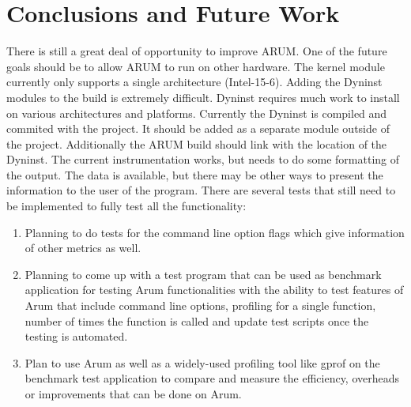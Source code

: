 \documentclass[11pt,letterpaper,oneside]{article}
\begin{document}
\section{Conclusions and Future Work}
\label{sec:conclusion}
There is still a great deal of opportunity to improve ARUM.   One of the future goals should be to allow ARUM to run on other hardware.  The kernel module currently only supports a single architecture (Intel-15-6).  Adding the Dyninst modules to the build is extremely difficult.  Dyninst requires much work to install on various architectures and platforms.   Currently the Dyninst is compiled and commited with the project.  It should be added as a separate module outside of the project.  Additionally the ARUM build should link with the location of the Dyninst.
\newline
The current instrumentation works, but needs to do some formatting of the output.  The data is available, but there may be other ways to present the information to the user of the program.
\newline
There are several tests that still need to be implemented to fully test all the functionality:
\begin{enumerate}
\item Planning to do tests for the command line option flags which give information of other metrics as well. 
\item Planning to come up with a test program that can be used as benchmark application for testing Arum functionalities with the ability to test features of Arum that include command line options, profiling for a single function, number of times the function is called and update test scripts once the	testing is automated.
\item Plan to use Arum as well as a widely-used profiling tool like gprof on the benchmark test application to compare and measure the efficiency,	overheads or improvements that can be done on Arum. 
\end{enumerate}




\end{document}
